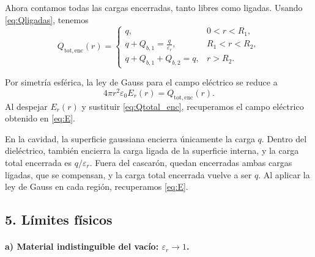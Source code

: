 \documentclass[11pt]{article}
\begin{document}
Ahora contamos todas las cargas encerradas, tanto libres
como ligadas. Usando \eqref{eq:Qligadas}, tenemos
\begin{equation}
  Q_{\mathrm{tot,enc}}(r)=
  \begin{cases}
    q,
      &0<r<R_1,\\[5pt]
    q+Q_{b,1}=\displaystyle\frac{q}{\varepsilon_r},
      &R_1<r<R_2,\\[7pt]
    q+Q_{b,1}+Q_{b,2}=q,
      &r>R_2.
  \end{cases}
  \label{eq:Qtotal_enc}
\end{equation}

Por simetría esférica, la ley de Gauss para el campo
eléctrico se reduce a
\[
  4\pi r^2\varepsilon_0E_r(r)=Q_{\mathrm{tot,enc}}(r).
\]
Al despejar $E_r(r)$ y sustituir
\eqref{eq:Qtotal_enc}, recuperamos el campo eléctrico
obtenido en \eqref{eq:E}.

En la cavidad, la superficie gaussiana encierra únicamente
la carga $q$. Dentro del dieléctrico, también encierra la carga
ligada de la superficie interna, y la carga total encerrada
es $q/\varepsilon_r$. Fuera del cascarón, quedan encerradas
ambas cargas ligadas, que se compensan, y la carga total
encerrada vuelve a ser $q$. Al aplicar la ley de Gauss
en cada región, recuperamos \eqref{eq:E}.

\subsection*{5. Límites físicos}

\begingroup
\setlength{\jot}{7pt}

\paragraph{a) Material indistinguible del vacío:
$\varepsilon_r\to1$.}
\end{document}
